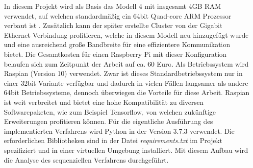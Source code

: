 In diesem Projekt wird als Basis das Modell 4 mit insgesamt 4GB \ac{RAM} verwendet, auf welchen standardmäßig ein 64bit Quad-core ARM Prozessor verbaut ist \cite{raspberryspecs}. Zusätzlich kann der später erstellte Cluster von der Gigabit Ethernet Verbindung profitieren, welche in diesem Modell neu hinzugefügt wurde und eine ausreichend große Bandbreite für eine effizientere Kommunikation bietet. Die Gesamtkosten für einen Raspberry Pi mit dieser Konfiguration belaufen sich zum Zeitpunkt der Arbeit auf ca. 60 Euro. Als Betriebssystem wird Raspian (Version 10) verwendet. Zwar ist dieses Standardbetriebssystem nur in einer 32bit Variante verfügbar und dadurch in vielen Fällen langsamer als andere 64bit Betriebssysteme, dennoch überwiegen die Vorteile für diese Arbeit. Raspian ist weit verbreitet und bietet eine hohe Kompatibilität zu diversen Softwarepaketen, wie zum Beispiel Tensorflow, von welchen zukünftige Erweiterungen profitieren können. Für die eigentliche Ausführung des implementierten Verfahrens wird Python in der Version 3.7.3 verwendet. Die erforderlichen Bibliotheken sind in der Datei \emph{requirements.txt} im Projekt spezifiziert und in einer virtuellen Umgebung installiert. Mit diesem Aufbau wird die Analyse des sequenziellen Verfahrens durchgeführt.
